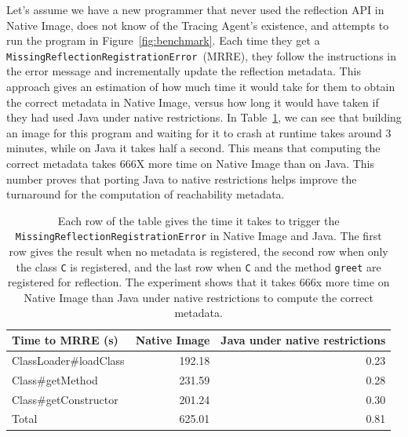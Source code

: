 Let's assume we have a new programmer that never used the reflection API in Native Image, does not know of the Tracing Agent's existence, and attempts to run the program in Figure~\ref{fig:benchmark}. Each time they get a \verb|MissingReflectionRegistrationError|~(MRRE), they follow the instructions in the error message and incrementally update the reflection metadata.
This approach gives an estimation of how much time it would take for them to obtain the correct metadata in Native Image, versus how long it would have taken if they had used Java under native restrictions. 
In Table~\ref{tab:benchmark}, we can see that building an image for this program and waiting for it to crash at runtime takes around 3 minutes, while on Java it takes half a second. This means that computing the correct metadata takes 666X more time on Native Image than on Java.
This number proves that porting Java to native restrictions helps improve the turnaround for the computation of reachability metadata.

\begin{table}[ht]
\centering
\begin{tabular}{@{}lrr@{}}
\toprule
Time to MRRE (s) & \multicolumn{1}{l}{Native Image} & \multicolumn{1}{l}{Java under native restrictions} \\ \midrule
ClassLoader\#loadClass          & 192.18 & 0.23 \\
Class\#getMethod                & 231.59 & 0.28 \\
Class\#getConstructor           & 201.24 & 0.30 \\ \midrule
Total                           & 625.01 & 0.81 \\ \bottomrule
\end{tabular}
\caption{Each row of the table gives the time it takes to trigger the \texttt{MissingReflectionRegistrationError} in Native Image and Java. The first row gives the result when no metadata is registered, the second row when only the class \texttt{C} is registered, and the last row when \texttt{C} and the method \texttt{greet} are registered for reflection. The experiment shows that it takes 666x more time on Native Image than Java under native restrictions to compute the correct metadata.}
\label{tab:benchmark}
\end{table}
